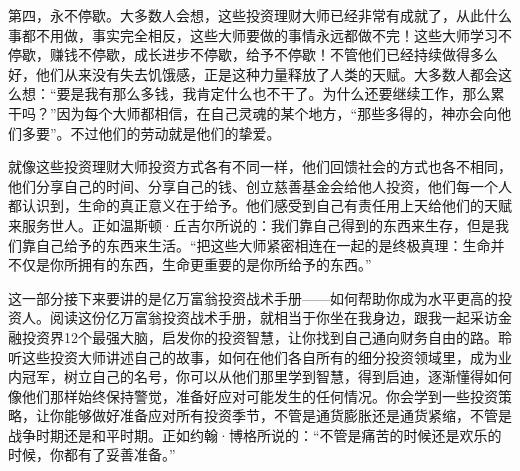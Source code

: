 第四，永不停歇。大多数人会想，这些投资理财大师已经非常有成就了，从此什么事都不用做，事实完全相反，这些大师要做的事情永远都做不完！这些大师学习不停歇，赚钱不停歇，成长进步不停歇，给予不停歇！不管他们已经持续做得多么好，他们从来没有失去饥饿感，正是这种力量释放了人类的天赋。大多数人都会这么想：“要是我有那么多钱，我肯定什么也不干了。为什么还要继续工作，那么累干吗？”因为每个大师都相信，在自己灵魂的某个地方，“那些多得的，神亦会向他们多要”。不过他们的劳动就是他们的挚爱。

就像这些投资理财大师投资方式各有不同一样，他们回馈社会的方式也各不相同，他们分享自己的时间、分享自己的钱、创立慈善基金会给他人投资，他们每一个人都认识到，生命的真正意义在于给予。他们感受到自己有责任用上天给他们的天赋来服务世人。正如温斯顿·丘吉尔所说的：我们靠自己得到的东西来生存，但是我们靠自己给予的东西来生活。“把这些大师紧密相连在一起的是终极真理：生命并不仅是你所拥有的东西，生命更重要的是你所给予的东西。”

这一部分接下来要讲的是亿万富翁投资战术手册——如何帮助你成为水平更高的投资人。阅读这份亿万富翁投资战术手册，就相当于你坐在我身边，跟我一起采访金融投资界12个最强大脑，启发你的投资智慧，让你找到自己通向财务自由的路。聆听这些投资大师讲述自己的故事，如何在他们各自所有的细分投资领域里，成为业内冠军，树立自己的名号，你可以从他们那里学到智慧，得到启迪，逐渐懂得如何像他们那样始终保持警觉，准备好应对可能发生的任何情况。你会学到一些投资策略，让你能够做好准备应对所有投资季节，不管是通货膨胀还是通货紧缩，不管是战争时期还是和平时期。正如约翰·博格所说的：“不管是痛苦的时候还是欢乐的时候，你都有了妥善准备。”
